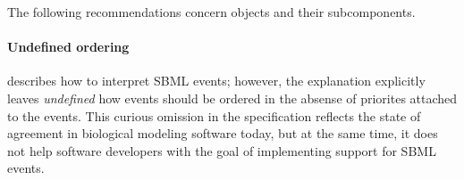 





The following recommendations concern \Event objects and their
subcomponents.


\paragraph{Undefined ordering}

 describes how to interpret SBML events;
however, the explanation explicitly leaves \emph{undefined} how
events should be ordered in the absense of priorites attached to
the events.  This curious omission in the specification reflects
the state of agreement in biological modeling software today, but
at the same time, it does not help software developers with the
goal of implementing support for SBML events.

